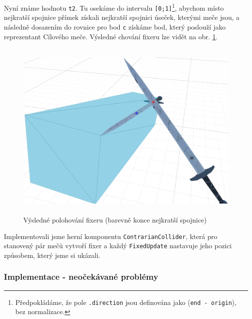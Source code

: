 Nyní známe hodnotu \texttt{t2}. Tu osekáme do intervalu \texttt{[0;1]}\footnote{Předpokládáme, že pole \texttt{.direction} jsou definována jako (\texttt{end - origin}), bez normalizace.}, abychom místo nejkratší spojnice přímek získali nejkratší spojnici úseček, kterými meče jsou, a následně dosazením do rovnice pro bod \texttt{c} získáme bod, který poslouží jako reprezentant Cílového meče. Výsledné chování fixeru lze vidět na obr. \ref{obr05:fixerPositioning}.


\begin{figure}[ht]\centering
  \center
  \includegraphics[height=90mm]{../img/collisionFix-show1.png}
  \caption{Výsledné polohování fixeru (barevně konce nejkratší spojnice)}
  \label{obr05:fixerPositioning}
\end{figure} 

Implementovali jsme herní komponentu \texttt{ContrarianCollider}, která pro stanovený pár mečů vytvoří fixer a každý \texttt{FixedUpdate} nastavuje jeho pozici způsobem, který jsme si ukázali.


\subsubsection*{Implementace - neočekávané problémy}

